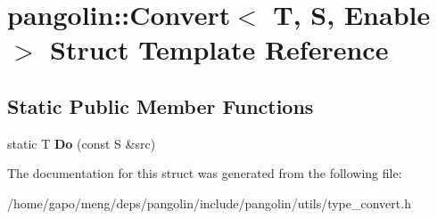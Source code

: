 \hypertarget{structpangolin_1_1_convert}{}\section{pangolin\+:\+:Convert$<$ T, S, Enable $>$ Struct Template Reference}
\label{structpangolin_1_1_convert}
\subsection*{Static Public Member Functions}
\begin{DoxyCompactItemize}
\item 
static T {\bfseries Do} (const S \&src)\hypertarget{structpangolin_1_1_convert_af2bf0fbbcf0674f51954fa0a2974f89d}{}\label{structpangolin_1_1_convert_af2bf0fbbcf0674f51954fa0a2974f89d}

\end{DoxyCompactItemize}


The documentation for this struct was generated from the following file\+:\begin{DoxyCompactItemize}
\item 
/home/gapo/meng/deps/pangolin/include/pangolin/utils/type\+\_\+convert.\+h\end{DoxyCompactItemize}
